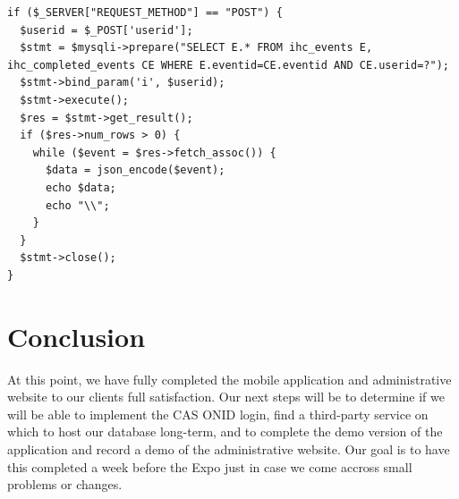 \documentclass[onecolumn, draftclsnofoot,10pt, compsoc]{IEEEtran}
\begin{document}
    \begin{lstlisting}[style=php]
if ($_SERVER["REQUEST_METHOD"] == "POST") {
  $userid = $_POST['userid'];
  $stmt = $mysqli->prepare("SELECT E.* FROM ihc_events E, ihc_completed_events CE WHERE E.eventid=CE.eventid AND CE.userid=?");
  $stmt->bind_param('i', $userid);
  $stmt->execute();
  $res = $stmt->get_result();
  if ($res->num_rows > 0) {
    while ($event = $res->fetch_assoc()) {
      $data = json_encode($event);
      echo $data;
      echo "\\";
    }
  }
  $stmt->close();
}
    \end{lstlisting}

\section{Conclusion}
  At this point, we have fully completed the mobile application and administrative website to our clients full satisfaction. Our next steps will be to determine if we will be able to implement the CAS ONID login, find a
  third-party service on which to host our database long-term, and to complete the demo version of the application and record a demo of the administrative website. Our goal is to have this completed a week before the Expo just in case we come accross small problems or changes.
\end{document}

